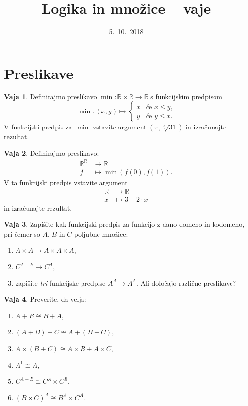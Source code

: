 \documentclass{article}
\newcommand{\RR}{\mathbb{R}}
\theoremstyle{definition}
\newtheorem{vaja}{Vaja}[section]
\begin{document}
\title{Logika in množice -- vaje}
\date{5.~10.~2018}
\maketitle

\setcounter{section}{0}
\section{Preslikave}

\bigskip\medskip

\begin{vaja}
  Definirajmo preslikavo $\min : \RR \times \RR \to \RR$ s funkcijskim predpisom
  \begin{equation*}
    \min : (x, y) \mapsto
    \begin{cases}
      x & \text{če $x \leq y$,} \\
      y & \text{če $y \leq x$.}
    \end{cases}
  \end{equation*}
  V funkcijski predpis za~$\min$ vstavite argument $(\pi, \sqrt[3]{31})$ in izračunajte
  rezultat.
\end{vaja}

\begin{vaja}
  Definirajmo preslikavo:
  \begin{align*}
    \RR^\RR &\to \RR \\
    f &\mapsto \min (f(0), f(1)).
  \end{align*}
  V ta funkcijski predpis vstavite argument
  \begin{align*}
    \RR &\to \RR \\
    x &\mapsto 3 - 2 \cdot x
  \end{align*}
  in izračunajte rezultat.
\end{vaja}


\begin{vaja}
  Zapišite kak funkcijski predpis za funkcijo z dano domeno in kodomeno,
  pri čemer so $A$, $B$ in $C$ poljubne množice:
  \begin{enumerate}
  \item $A \times A \to A \times A \times A$,
  \item $C^{A+B} \to C^A$,
  \item zapišite \emph{tri} funkcijske predpise $A^A \to A^A$. Ali določajo različne preslikave?
  \end{enumerate}
\end{vaja}

\begin{vaja}
  Preverite, da velja:
  \begin{enumerate}
  \item $A + B \cong B + A$,
  \item $(A + B) + C \cong A + (B + C)$,
  \item $A \times (B + C) \cong A \times B + A \times C$,
  \item $A^1 \cong A$,
  \item $C^{A + B} \cong C^A \times C^B$,
  \item $(B \times C)^A \cong B^A \times C^A$.
  \end{enumerate}
\end{vaja}
\end{document}
